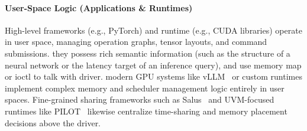 \paragraph{User-Space Logic (Applications \& Runtimes)}
High-level frameworks (e.g., PyTorch) and runtime (e.g., CUDA libraries) operate in user space, managing operation graphs, tensor layouts, and command submissions. they possess rich semantic information (such as the structure of a neural network or the latency target of an inference query), and use memory map or  ioctl to talk with driver.
modern GPU systems like vLLM~\cite{kwon2023efficient} or custom runtimes implement complex memory and scheduler management logic entirely in user spaces. Fine-grained sharing frameworks such as Salus~\cite{salus} and UVM-focused runtimes like PILOT~\cite{pilot} likewise centralize time-sharing and memory placement decisions above the driver.

% 

